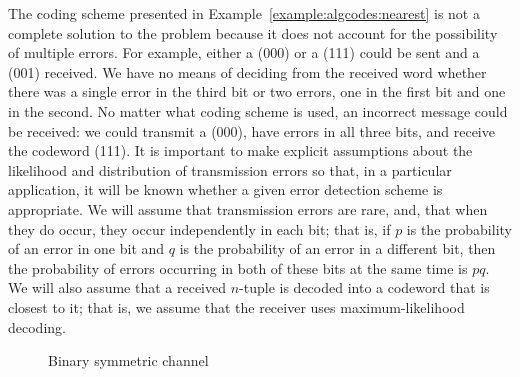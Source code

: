 
The coding scheme presented in Example~\ref{example:algcodes:nearest} is not a complete solution to
the problem because it does not account for the possibility of
multiple errors. For example, either a (000) or a (111) could be sent
and a (001) received. We have no means of deciding from the received
word whether there was a single error in the third bit or two errors,
one in the first bit and one in the second.  No matter what coding 
scheme is used, an incorrect message could
be received: we could transmit a (000), have errors in all three
bits, and receive the codeword (111). It is important to make explicit
assumptions about the likelihood and distribution of transmission
errors so that, in a particular application, it will be known whether
a given
error detection scheme is appropriate. We will assume that
transmission errors are rare, and, that when they do occur, they occur
independently in each bit; that is, if $p$ is the probability of an
error in one bit and $q$ is the probability of an error in a different
bit, then the probability of errors occurring in both of these bits at
the same time is $pq$. We will also assume that a received $n$-tuple 
is
decoded into a codeword that is closest to it; that is, we assume that
the receiver uses {\bfi maximum-likelihood
decoding}.
 
 
\begin{figure}[htb]  %
\begin{center}

\end{center}
\caption{Binary symmetric channel}
\label{channel}
\end{figure}
 
